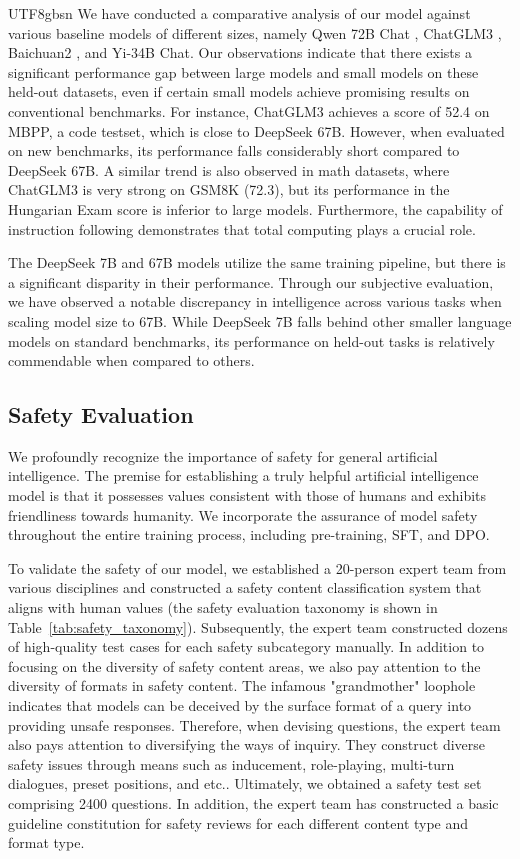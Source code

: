 \documentclass[11pt, a4paper, logo, copyright, nonumbering]{deepseek}
\begin{document}
\begin{CJK*}{UTF8}{gbsn}
We have conducted a comparative analysis of our model against various baseline models of different sizes, namely Qwen 72B Chat \citep{qwen}, ChatGLM3 \citep{glm}, Baichuan2 \citep{baichuan2}, and Yi-34B Chat. Our observations indicate that there exists a significant performance gap between large models and small models on these held-out datasets, even if certain small models achieve promising results on conventional benchmarks. For instance, ChatGLM3 achieves a score of 52.4 on MBPP, a code testset, which is close to DeepSeek 67B. However, when evaluated on new benchmarks, its performance falls considerably short compared to  DeepSeek 67B. A similar trend is also observed in math datasets, where ChatGLM3 is very strong on GSM8K (72.3), but its performance in the Hungarian Exam score is inferior to large models. Furthermore, the capability of instruction following demonstrates that total computing plays a crucial role. 

The DeepSeek 7B and 67B models utilize the same training pipeline, but there is a significant disparity in their performance. Through our subjective evaluation, we have observed a notable discrepancy in intelligence across various tasks when scaling model size to 67B. While DeepSeek 7B falls behind other smaller language models on standard benchmarks, its performance on held-out tasks is relatively commendable when compared to others.



\subsection{Safety Evaluation}
We profoundly recognize the importance of safety for general artificial intelligence. The premise for establishing a truly helpful artificial intelligence model is that it possesses values consistent with those of humans and exhibits friendliness towards humanity.
We incorporate the assurance of model safety throughout the entire training process, including pre-training, SFT, and DPO.

To validate the safety of our model, we established a 20-person expert team from various disciplines and constructed a safety content classification system that aligns with human values (the safety evaluation taxonomy is shown in Table~\ref{tab:safety_taxonomy}). Subsequently, the expert team constructed dozens of high-quality test cases for each safety subcategory manually.
In addition to focusing on the diversity of safety content areas, we also pay attention to the diversity of formats in safety content. The infamous "grandmother" loophole indicates that models can be deceived by the surface format of a query into providing unsafe responses.
Therefore, when devising questions, the expert team also pays attention to diversifying the ways of inquiry. They construct diverse safety issues through means such as inducement, role-playing, multi-turn dialogues, preset positions, and etc..
Ultimately, we obtained a safety test set comprising 2400 questions. In addition, the expert team has constructed a basic guideline constitution for safety reviews for each different content type and format type.


\end{CJK*}
\end{document}
